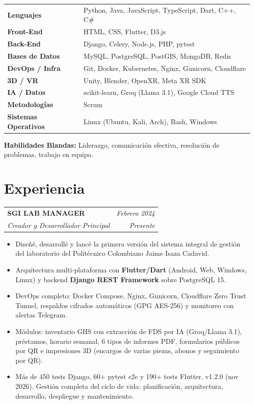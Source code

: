 \documentclass[11pt, a4paper]{article}
\makeatletter
\newcommand{\expentry}[4]{%
  \noindent
  \begin{tabularx}{\textwidth}{@{}X r@{}}
    \textbf{\color{primary}#1} & \textit{\small\color{darkgray}#3} \\
    \textit{\color{accent}#2}  & \textit{\small\color{darkgray}#4} \\
  \end{tabularx}%
}
\makeatother
\begin{document}
\begin{tabularx}{\textwidth}{@{} >{\bfseries\color{darkgray}}l X @{}}
Lenguajes            & Python, Java, JavaScript, TypeScript, Dart, C++, C\# \\[2pt]
Front-End            & HTML, CSS, Flutter, D3.js \\[2pt]
Back-End             & Django, Celery, Node.js, PHP, pytest \\[2pt]
Bases de Datos       & MySQL, PostgreSQL, PostGIS, MongoDB, Redis \\[2pt]
DevOps / Infra       & Git, Docker, Kubernetes, Nginx, Gunicorn, Cloudflare \\[2pt]
3D / VR              & Unity, Blender, OpenXR, Meta XR SDK \\[2pt]
IA / Datos           & scikit-learn, Groq (Llama 3.1), Google Cloud TTS \\[2pt]
Metodologías         & Scrum \\[2pt]
Sistemas Operativos  & Linux (Ubuntu, Kali, Arch), Bash, Windows \\
\end{tabularx}

\medskip
\noindent\textbf{\color{darkgray}Habilidades Blandas:}
Liderazgo, comunicación efectiva, resolución de problemas, trabajo en equipo.

\section{Experiencia}

\expentry{SGI LAB MANAGER}{Creador y Desarrollador Principal}{Febrero 2024}{Presente}

\begin{itemize}
  \item Diseñé, desarrollé y lancé la primera versión del sistema integral de gestión del
        laboratorio del Politécnico Colombiano Jaime Isaza Cadavid.
  \item Arquitectura multi-plataforma con \textbf{Flutter/Dart} (Android, Web, Windows, Linux)
        y backend \textbf{Django REST Framework} sobre PostgreSQL 15.
  \item DevOps completo: Docker Compose, Nginx, Gunicorn, Cloudflare Zero Trust Tunnel,
        respaldos cifrados automáticos (GPG AES-256) y monitoreo con alertas Telegram.
  \item Módulos: inventario GHS con extracción de FDS por IA (Groq/Llama 3.1), préstamos,
        horario semanal, 6 tipos de informes PDF, formularios públicos por QR e impresiones 3D
        (encargos de varias piezas, abonos y seguimiento por QR).
  \item Más de 450 tests Django, 60+ pytest e2e y 190+ tests Flutter. v1.2.0 (nov 2026).
        Gestión completa del ciclo de vida: planificación, arquitectura, desarrollo,
        despliegue y mantenimiento.
\end{itemize}
\end{document}

